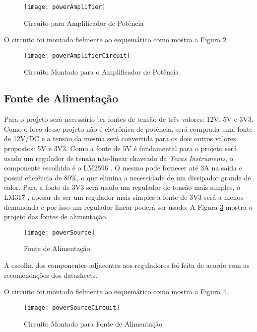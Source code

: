 	\begin{figure}[htbp]
		\centering
			\texttt{[image: powerAmplifier]}
		\caption{Circuito para Amplificador de Potência}
		\label{fig-powerAmplifier}
	\end{figure}
	
	O circuito foi montado fielmente ao esquemático como mostra a Figura \ref{fig-powerAmplifierCircuit}.
	
	\begin{figure}[htbp]
		\centering
			\texttt{[image: powerAmplifierCircuit]}
		\caption{Circuito Montado para o Amplificador de Potência}
		\label{fig-powerAmplifierCircuit}
	\end{figure}

\subsection{Fonte de Alimentação}

	Para o projeto será necessário ter fontes de tensão de três valores: 12V, 5V e 3V3. Como o foco desse projeto não é eletrônica de potência, será comprada uma fonte de 12V/DC e a tensão da mesma será convertida para os dois outros valores propostos: 5V e 3V3. Como a fonte de 5V é fundamental para o projeto será usado um regulador de tensão não-linear chaveado da \textit{Texas Instruments}, o componente escolhido é o LM2596 \cite{lm2596}. O mesmo pode fornecer até 3A na saída e possui eficiência de 80\%, o que elimina a necessidade de um dissipador grande de calor. Para a fonte de 3V3 será usado um regulador de tensão mais simples, o LM317 \cite{lm317}, apesar de ser um regulador mais simples a fonte de 3V3 será a menos demandada e por isso um regulador linear poderá ser usado. A Figura \ref{fig-powerSouce} mostra o projeto das fontes de alimentação.
	
	\begin{figure}[htbp]
		\centering
			\texttt{[image: powerSource]}
		\caption{Fonte de Alimentação}
		\label{fig-powerSouce}
	\end{figure}
	
	A escolha dos componentes adjacentes aos reguladores foi feita de acordo com as recomendações dos datasheets.  
	
	O circuito foi montado fielmente ao esquemático como mostra a Figura \ref{fig-powerSourceCircuit}.
	
	\begin{figure}[htbp]
		\centering
			\texttt{[image: powerSourceCircuit]}
		\caption{Circuito Montado para Fonte de Alimentação}
		\label{fig-powerSourceCircuit}
	\end{figure}
